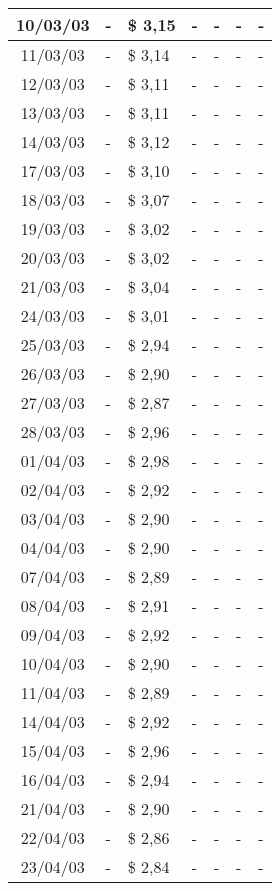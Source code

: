 \begin{center}
\begin{longtable}{|c|p{1.5cm}|p{1.5cm}|p{1.5cm}|p{1.5cm}|p{1.5cm}|p{1.5cm}|}
10/03/03 & - & \$ 3,15 & - & - & - & - \\ \hline
11/03/03 & - & \$ 3,14 & - & - & - & - \\ \hline
12/03/03 & - & \$ 3,11 & - & - & - & - \\ \hline
13/03/03 & - & \$ 3,11 & - & - & - & - \\ \hline
14/03/03 & - & \$ 3,12 & - & - & - & - \\ \hline
17/03/03 & - & \$ 3,10 & - & - & - & - \\ \hline
18/03/03 & - & \$ 3,07 & - & - & - & - \\ \hline
19/03/03 & - & \$ 3,02 & - & - & - & - \\ \hline
20/03/03 & - & \$ 3,02 & - & - & - & - \\ \hline
21/03/03 & - & \$ 3,04 & - & - & - & - \\ \hline
24/03/03 & - & \$ 3,01 & - & - & - & - \\ \hline
25/03/03 & - & \$ 2,94 & - & - & - & - \\ \hline
26/03/03 & - & \$ 2,90 & - & - & - & - \\ \hline
27/03/03 & - & \$ 2,87 & - & - & - & - \\ \hline
28/03/03 & - & \$ 2,96 & - & - & - & - \\ \hline
01/04/03 & - & \$ 2,98 & - & - & - & - \\ \hline
02/04/03 & - & \$ 2,92 & - & - & - & - \\ \hline
03/04/03 & - & \$ 2,90 & - & - & - & - \\ \hline
04/04/03 & - & \$ 2,90 & - & - & - & - \\ \hline
07/04/03 & - & \$ 2,89 & - & - & - & - \\ \hline
08/04/03 & - & \$ 2,91 & - & - & - & - \\ \hline
09/04/03 & - & \$ 2,92 & - & - & - & - \\ \hline
10/04/03 & - & \$ 2,90 & - & - & - & - \\ \hline
11/04/03 & - & \$ 2,89 & - & - & - & - \\ \hline
14/04/03 & - & \$ 2,92 & - & - & - & - \\ \hline
15/04/03 & - & \$ 2,96 & - & - & - & - \\ \hline
16/04/03 & - & \$ 2,94 & - & - & - & - \\ \hline
21/04/03 & - & \$ 2,90 & - & - & - & - \\ \hline
22/04/03 & - & \$ 2,86 & - & - & - & - \\ \hline
23/04/03 & - & \$ 2,84 & - & - & - & - \\ \hline

\end{longtable}
\end{center}

